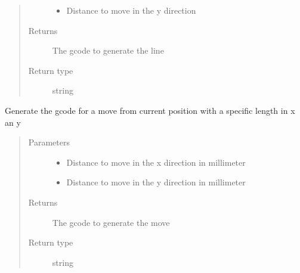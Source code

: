 \documentclass[letterpaper,10pt,english]{sphinxmanual}
\begin{document}
\begin{fulllineitems}
\begin{fulllineitems}
\begin{quote}
\begin{description}
\begin{itemize}
\item {} 
\sphinxAtStartPar
{} \textendash{} Distance to move in the y direction

\end{itemize}

\item[{Returns}] \leavevmode
\sphinxAtStartPar
The gcode to generate the line

\item[{Return type}] \leavevmode
\sphinxAtStartPar
string

\end{description}\end{quote}

\end{fulllineitems}


\begin{fulllineitems}
\label{\detokenize{index:generator.generator.move}}
\sphinxAtStartPar
Generate the gcode for a move from current position with a specific length in x an y
\begin{quote}\begin{description}
\item[{Parameters}] \leavevmode\begin{itemize}
\item {} 
\sphinxAtStartPar
{} \textendash{} Distance to move in the x direction in millimeter

\item {} 
\sphinxAtStartPar
{} \textendash{} Distance to move in the y direction in millimeter

\end{itemize}

\item[{Returns}] \leavevmode
\sphinxAtStartPar
The gcode to generate the move

\item[{Return type}] \leavevmode
\sphinxAtStartPar
string

\end{description}\end{quote}

\end{fulllineitems}


\end{fulllineitems}
\end{document}
